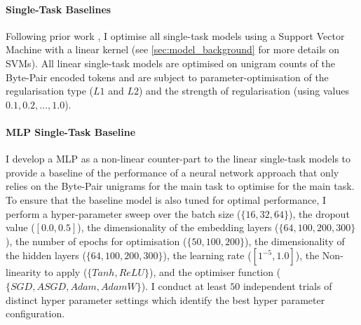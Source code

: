 \paragraph{Single-Task Baselines}
Following prior work \citep{Waseem:2016,Davidson:2017}, I optimise all single-task models using a Support Vector Machine with a linear kernel (see \cref{sec:model_background} for more details on SVMs).
All linear single-task models are optimised on unigram counts of the Byte-Pair encoded tokens and are subject to parameter-optimisation of the regularisation type ($L1$ and $L2$) and the strength of regularisation (using values $0.1, 0.2, \ldots, 1.0$).

\paragraph{MLP Single-Task Baseline}
I develop a MLP as a non-linear counter-part to the linear single-task models to provide a baseline of the performance of a neural network approach that only relies on the Byte-Pair unigrams for the main task to optimise for the main task.
To ensure that the baseline model is also tuned for optimal performance, I perform a hyper-parameter sweep  over the batch size ($\{16, 32, 64\}$), the dropout value ($[0.0, 0.5]$), the dimensionality of the embedding layers ($\{64, 100, 200, 300\}$), the number of epochs for optimisation ($\{50, 100, 200\}$), the dimensionality of the hidden layers ($\{64, 100, 200, 300\}$), the learning rate ($[1^{-5}, 1.0]$), the Non-linearity to apply ($\{Tanh, ReLU\}$), and the optimiser function ($\{SGD, ASGD, Adam, AdamW\}$).
I conduct at least $50$ independent trials of distinct hyper parameter settings which identify the best hyper parameter configuration.

